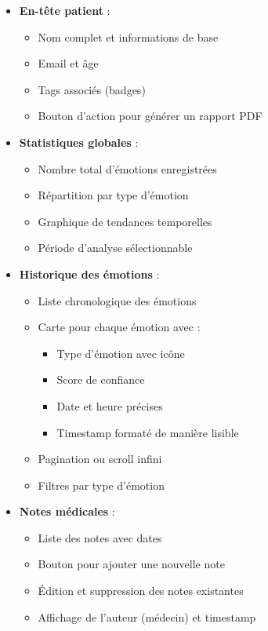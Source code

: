 \documentclass[a4paper,11pt]{report}
\begin{document}
\begin{itemize}
    \item \textbf{En-tête patient} :
    \begin{itemize}
        \item Nom complet et informations de base
        \item Email et âge
        \item Tags associés (badges)
        \item Bouton d'action pour générer un rapport PDF
    \end{itemize}
    
    \item \textbf{Statistiques globales} :
    \begin{itemize}
        \item Nombre total d'émotions enregistrées
        \item Répartition par type d'émotion
        \item Graphique de tendances temporelles
        \item Période d'analyse sélectionnable
    \end{itemize}
    
    \item \textbf{Historique des émotions} :
    \begin{itemize}
        \item Liste chronologique des émotions
        \item Carte pour chaque émotion avec :
        \begin{itemize}
            \item Type d'émotion avec icône
            \item Score de confiance
            \item Date et heure précises
            \item Timestamp formaté de manière lisible
        \end{itemize}
        \item Pagination ou scroll infini
        \item Filtres par type d'émotion
    \end{itemize}
    
    \item \textbf{Notes médicales} :
    \begin{itemize}
        \item Liste des notes avec dates
        \item Bouton pour ajouter une nouvelle note
        \item Édition et suppression des notes existantes
        \item Affichage de l'auteur (médecin) et timestamp
    \end{itemize}
    

\end{itemize}
\end{document}
